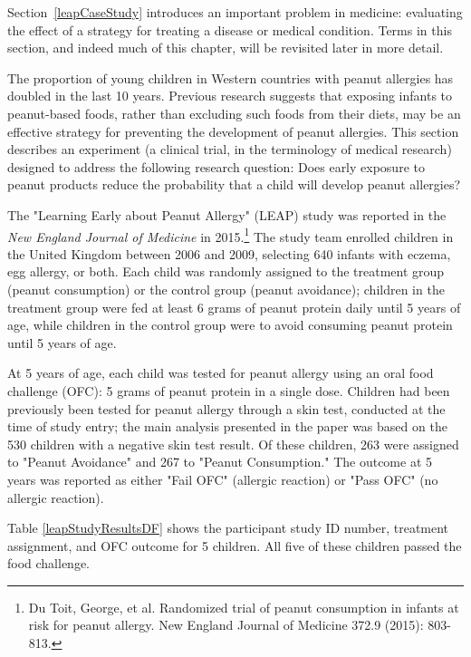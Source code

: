 
Section~\ref{leapCaseStudy} introduces an important problem in medicine: evaluating the effect of a strategy for treating a disease or medical condition. Terms in this section, and indeed much of this chapter, will be revisited later in more detail.

The proportion of young children in Western countries with peanut allergies has doubled in the last 10 years. Previous research suggests that exposing infants to peanut-based foods, rather than excluding such foods from their diets, may be an effective strategy for preventing the development of peanut allergies. This section describes an experiment (a clinical trial, in the terminology of medical research) designed to address the following research question: Does early exposure to peanut products reduce the probability that a child will develop peanut allergies? 

The "Learning Early about Peanut Allergy" (LEAP) study was reported in the \textit{New England Journal of Medicine} in 2015.\footnote{Du Toit, George, et al. Randomized trial of peanut consumption in infants at risk for peanut allergy. New England Journal of Medicine 372.9 (2015): 803-813.} The study team enrolled children in the United Kingdom between 2006 and 2009, selecting 640 infants with eczema, egg allergy, or both. Each child was randomly assigned to the treatment group (peanut consumption) or the control group (peanut avoidance); children in the treatment group were fed at least 6 grams of peanut protein daily until 5 years of age, while children in the control group were to avoid consuming peanut protein until 5 years of age. 

At 5 years of age, each child was tested for peanut allergy using an oral food challenge (OFC): 5 grams of peanut protein in a single dose. Children had been previously been tested for peanut allergy through a skin test, conducted at the time of study entry; the main analysis presented in the paper was based on the 530 children with a negative skin test result. Of these children, 263 were assigned to "Peanut Avoidance" and 267 to "Peanut Consumption." The outcome at 5 years was reported as either "Fail OFC" (allergic reaction) or "Pass OFC" (no allergic reaction). 

Table \ref{leapStudyResultsDF} shows the participant study ID number, treatment assignment, and OFC outcome for 5 children. All five of these children passed the food challenge. 
 

